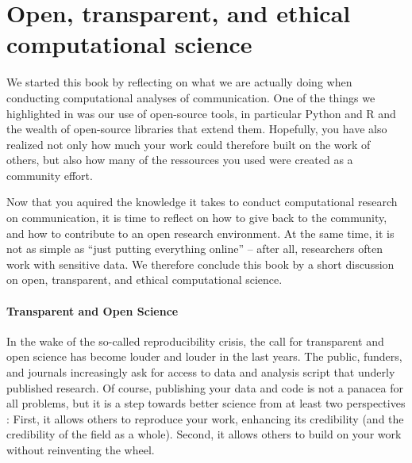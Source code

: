 


\section{Open, transparent, and ethical computational science}
\label{sec:ethics}


We started this book by reflecting on what we are actually doing when conducting computational analyses of communication.
One of the things we highlighted in  was our use of open-source tools, in particular Python and R
and the wealth of open-source libraries that extend them. Hopefully, you have also realized not only how much your work could
therefore built on the work of others, but also how many of the ressources you used were created as a community effort.

Now that you aquired the knowledge it takes to conduct computational research on communication, it is time to reflect
on how to give back to the community, and how to contribute to an open research environment. At the same time, it is
not as simple as ``just putting everything online'' -- after all, researchers often work with sensitive data. We therefore
conclude this book by a short discussion on open, transparent, and ethical computational science.


\paragraph{Transparent and Open Science}
In the wake of the so-called reproducibility crisis, the call for transparent and open science has become louder and louder
in the last years. The public, funders, and journals increasingly ask for access to data and analysis script that underly
published research. Of course, publishing your data and code is not a panacea for all problems, but it is a step towards
better science from at least two perspectives \citep{VanAtteveldt2019}: First, it allows others to reproduce your work, enhancing its credibility
(and the credibility of the field as a whole). Second, it allows others to build on your work without reinventing the wheel.

